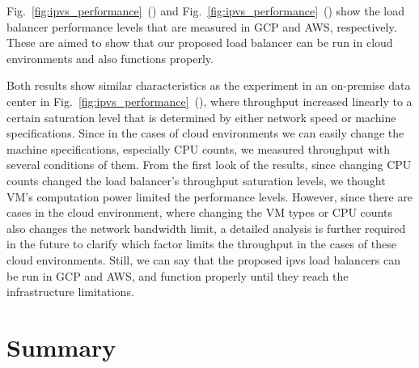 Fig.~\ref{fig:ipvs_performance}~() and Fig.~\ref{fig:ipvs_performance}~() show the load balancer performance levels that are measured in GCP and AWS, respectively.
These are aimed to show that our proposed load balancer can be run in cloud environments and also functions properly.

Both results show similar characteristics as the experiment in an on-premise data center in Fig.~\ref{fig:ipvs_performance}~(), where throughput increased linearly to a certain saturation level that is determined by either network speed or machine specifications.
Since in the cases of cloud environments we can easily change the machine specifications, especially CPU counts, we measured throughput with several conditions of them.
From the first look of the results, since changing CPU counts changed the load balancer's throughput saturation levels, we thought VM's computation power limited the performance levels.
However, since there are cases in the cloud environment, where changing the VM types or CPU counts also changes the network bandwidth limit, a detailed analysis is further required in the future to clarify which factor limits the throughput in the cases of these cloud environments.
Still, we can say that the proposed ipvs load balancers can be run in GCP and AWS, and function properly until they reach the infrastructure limitations.

\FloatBarrier

\section{Summary}



